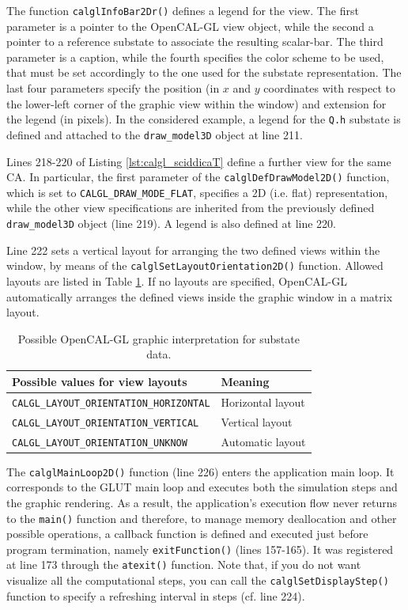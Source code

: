 The function \verb'calglInfoBar2Dr()' defines a legend for the
view. The first parameter is a pointer to the OpenCAL-GL view object,
while the second a pointer to a reference substate to associate the
resulting scalar-bar. The third parameter is a caption, while the
fourth specifies the color scheme to be used, that must be set
accordingly to the one used for the substate representation. The last
four parameters specify the position (in $x$ and $y$ coordinates with
respect to the lower-left corner of the graphic view within the
window) and extension for the legend (in pixels). In the considered
example, a legend for the \verb'Q.h' substate is defined and attached
to the \verb'draw_model3D' object at line 211.

Lines 218-220 of Listing \ref{lst:calgl_sciddicaT} define a further
view for the same CA. In particular, the first parameter of the
\verb'calglDefDrawModel2D()' function, which is set to
\verb'CALGL_DRAW_MODE_FLAT', specifies a 2D (i.e. flat)
representation, while the other view specifications are inherited from
the previously defined \verb'draw_model3D' object (line 219). A legend
is also defined at line 220.

Line 222 sets a vertical layout for arranging the two defined views
within the window, by means of the
\verb'calglSetLayoutOrientation2D()' function. Allowed layouts are
listed in Table \ref{tab:calgl_layouts}. If no layouts are specified,
OpenCAL-GL automatically arranges the defined views inside the graphic
window in a matrix layout.

\begin{table}
  \centering
  \small
  \begin{tabular}{l|l}
    \hline
    Possible values for view layouts & Meaning\\
    \hline
    \verb'CALGL_LAYOUT_ORIENTATION_HORIZONTAL' & Horizontal layout\\
    \verb'CALGL_LAYOUT_ORIENTATION_VERTICAL'   & Vertical layout\\
    \verb'CALGL_LAYOUT_ORIENTATION_UNKNOW'     & Automatic layout\\
    \hline
  \end{tabular}
  \caption{Possible OpenCAL-GL graphic interpretation for substate data.}
  \label{tab:calgl_layouts}
\end{table}

The \verb'calglMainLoop2D()' function (line 226) enters the
application main loop. It corresponds to the GLUT main loop and
executes both the simulation steps and the graphic rendering. As a
result, the application's execution flow never returns to the
\verb'main()' function and therefore, to manage memory deallocation
and other possible operations, a callback function is defined and
executed just before program termination, namely \verb'exitFunction()'
(lines 157-165). It was registered at line 173 through the
\verb'atexit()' function. Note that, if you do not want visualize all
the computational steps, you can call the \verb'calglSetDisplayStep()'
function to specify a refreshing interval in steps (cf. line 224).

